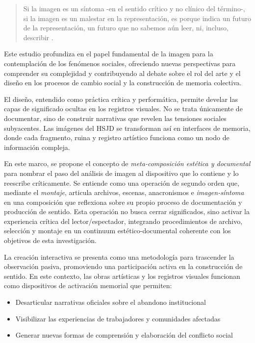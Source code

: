\begin{quote}
Si la imagen es un síntoma -en el sentido crítico y no clínico del término-, si la imagen es un malestar en la representación, es porque indica un futuro de la representación, un futuro que no sabemos aún leer, ni, incluso, describir \parencite[p. 177]{DidiHuberman2011}.
\end{quote}

Este estudio profundiza en el papel fundamental de la imagen para la contemplación de los fenómenos sociales, ofreciendo nuevas perspectivas para comprender su complejidad y contribuyendo al debate sobre el rol del arte y el diseño en los procesos de cambio social y la construcción de memoria colectiva.

El diseño, entendido como práctica crítica y performática, permite develar las capas de significado ocultas en los registros visuales. No se trata únicamente de documentar, sino de construir narrativas que revelen las tensiones sociales subyacentes. Las imágenes del HSJD se transforman así en interfaces de memoria, donde cada fragmento, ruina y registro artístico funciona como un nodo de información compleja.

\textcolor{edit30sept}{En este marco, se propone el concepto de \textit{meta-composición estética y documental} para nombrar el paso del análisis de imagen al dispositivo que lo contiene y lo reescribe críticamente. Se entiende como una operación de segundo orden que, mediante el \textit{montaje}, articula archivos, escenas, anacronismos e \textit{imagen-síntoma} en una composición que reflexiona sobre su propio proceso de documentación y producción de sentido. Esta operación no busca cerrar significados, sino activar la experiencia crítica del lector/espectador, integrando procedimientos de archivo, selección y montaje en un continuum estético-documental coherente con los objetivos de esta investigación.}

La creación interactiva se presenta como una metodología para trascender la observación pasiva, promoviendo una participación activa en la construcción de sentido. En este contexto, las obras artísticas y los registros visuales funcionan como dispositivos de activación memorial que permiten:

\begin{itemize}
    \item Desarticular narrativas oficiales sobre el abandono institucional
    \item Visibilizar las experiencias de trabajadores y comunidades afectadas
    \item Generar nuevas formas de comprensión y elaboración del conflicto social
\end{itemize}

